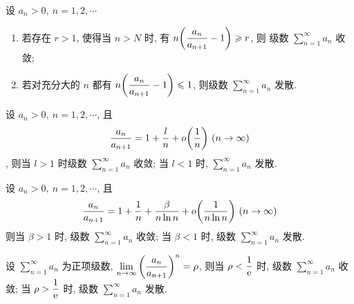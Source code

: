 \begin{theorem}
    设 $a_n>0,~n=1,2, \cdots $\begin{enumerate}[label=(\arabic{*})]
        \item 若存在 $r>1$, 使得当 $n>N$ 时, 有 $n\qty(\dfrac{a_n}{a_{n+1}}-1)\geqslant r$, 则 级数 $\displaystyle \sum_{n=1}^{\infty}a_n$ 收敛;
        \item 若对充分大的 $n$ 都有 $n\qty(\dfrac{a_n}{a_{n+1}}-1)\leqslant 1$, 则级数 $\displaystyle \sum_{n=1}^{\infty}a_n$ 发散.
    \end{enumerate}
\end{theorem}

\begin{theorem}
    设 $a_n>0,~n=1,2, \cdots $, 且 $$\dfrac{a_n}{a_{n+1}}=1+\dfrac{l}{n}+o\qty(\dfrac{1}{n}) ~(n\to \infty)$$, 则当 $l>1$ 时级数 $\displaystyle \sum_{n=1}^{\infty} a_n$ 收敛; 当 $l<1$ 时, $\displaystyle \sum_{n=1}^{\infty} a_n$ 发散.
\end{theorem}

\begin{theorem}
    设 $a_n>0,~n=1,2, \cdots $, 且 $$
        \dfrac{a_n}{a_{n+1}}=1+\dfrac{1}{n}+\dfrac{\beta}{n\ln n}+o\qty(\dfrac{1}{n\ln n})~(n\to \infty)
    $$
    则当 $\beta>1$ 时, 级数 $\displaystyle \sum_{n=1}^{\infty} a_n$ 收敛; 当 $\beta<1$ 时, 级数 $\displaystyle \sum_{n=1}^{\infty} a_n$ 发散.
\end{theorem}

\begin{theorem}
    设 $\displaystyle \sum_{n=1}^{\infty} a_n$ 为正项级数, $\displaystyle \lim_{n \to \infty}\qty(\dfrac{a_n}{a_{n+1}})^{n}=\rho$,
    则当 $\rho<\dfrac{1}{\mathrm{e}}$ 时, 级数 $\displaystyle \sum_{n=1}^{\infty} a_n$ 收敛; 当 $\rho>\dfrac{1}{\mathrm{e}}$ 时, 级数 $\displaystyle \sum_{n=1}^{\infty} a_n$ 发散.
\end{theorem}

